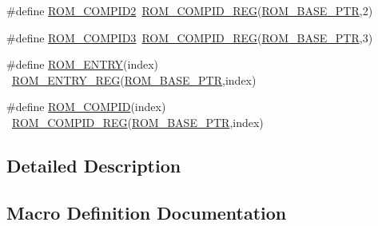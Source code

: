 \begin{DoxyCompactItemize}
\item 
\#define \hyperlink{group___r_o_m___register___accessor___macros_ga3a7a24370ddc945268ab011f5ad36e8f}{R\+O\+M\+\_\+\+C\+O\+M\+P\+I\+D2}~\hyperlink{group___r_o_m___register___accessor___macros_ga6c627260c5decb61186ddcb1ebef66b5}{R\+O\+M\+\_\+\+C\+O\+M\+P\+I\+D\+\_\+\+R\+EG}(\hyperlink{group___r_o_m___peripheral_ga5ad426d10b6832ca7012e8767113f686}{R\+O\+M\+\_\+\+B\+A\+S\+E\+\_\+\+P\+TR},2)
\item 
\#define \hyperlink{group___r_o_m___register___accessor___macros_ga7789fe9cc0215fcd4cae71f04764e9f7}{R\+O\+M\+\_\+\+C\+O\+M\+P\+I\+D3}~\hyperlink{group___r_o_m___register___accessor___macros_ga6c627260c5decb61186ddcb1ebef66b5}{R\+O\+M\+\_\+\+C\+O\+M\+P\+I\+D\+\_\+\+R\+EG}(\hyperlink{group___r_o_m___peripheral_ga5ad426d10b6832ca7012e8767113f686}{R\+O\+M\+\_\+\+B\+A\+S\+E\+\_\+\+P\+TR},3)
\item 
\#define \hyperlink{group___r_o_m___register___accessor___macros_gae7fe080723a45dadcc7b97319cb33331}{R\+O\+M\+\_\+\+E\+N\+T\+RY}(index)                                              ~\hyperlink{group___r_o_m___register___accessor___macros_gaa621177d86d2cbf2946deff1d6b18d97}{R\+O\+M\+\_\+\+E\+N\+T\+R\+Y\+\_\+\+R\+EG}(\hyperlink{group___r_o_m___peripheral_ga5ad426d10b6832ca7012e8767113f686}{R\+O\+M\+\_\+\+B\+A\+S\+E\+\_\+\+P\+TR},index)
\item 
\#define \hyperlink{group___r_o_m___register___accessor___macros_ga6238d799bb485f4ae8bf36985004c16b}{R\+O\+M\+\_\+\+C\+O\+M\+P\+ID}(index)                                            ~\hyperlink{group___r_o_m___register___accessor___macros_ga6c627260c5decb61186ddcb1ebef66b5}{R\+O\+M\+\_\+\+C\+O\+M\+P\+I\+D\+\_\+\+R\+EG}(\hyperlink{group___r_o_m___peripheral_ga5ad426d10b6832ca7012e8767113f686}{R\+O\+M\+\_\+\+B\+A\+S\+E\+\_\+\+P\+TR},index)
\end{DoxyCompactItemize}


\subsection{Detailed Description}


\subsection{Macro Definition Documentation}
